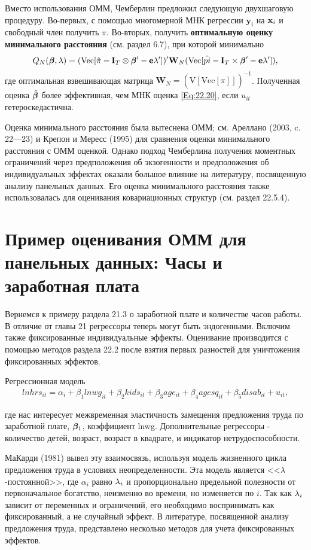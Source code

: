 Вместо использования ОММ, Чемберлин предложил следующую двухшаговую процедуру. Во-первых, с помощью многомерной МНК регрессии $\mathbf y_i$ на $\mathbf{x}_i$ и свободный член получить $\hat{\pi}$. Во-вторых, получить \textbf{оптимальную  оценку минимального расстояния} (см. раздел 6.7), при которой минимально
\begin{align}
Q_N(\bm{\beta}, \lambda)=(\mathrm{Vec}[\hat{\pi}-\mathbf I_T \otimes \bm{\beta}' - \mathbf e \lambda'])'\mathbf W_N(\mathrm{Vec}[\hat{pi}-\mathbf I_T \times \bm{\beta}' - \mathbf e \lambda']),
\nonumber
\end{align}
где оптимальная взвешивающая матрица $\mathbf W_N=(\hat{\mathrm{V}}[\mathrm{Vec}[\pi]])^{-1}$. Полученная оценка $\hat{\bm{\beta}}$ более эффективная, чем МНК оценка \ref{Eq:22.20}, если $u_{it}$ гетероскедастична.

Оценка минимального расстояния была вытеснена ОММ; см. Ареллано (2003, c. 22---23) и Крепон и Мересс (1995) для сравнения оценки минимального расстояния с ОММ оценкой. Однако подход Чемберлина получения моментных ограничений через предположения об экзогенности и предположения об индивидуальных эффектах оказали большое влияние на литературу, посвященную анализу панельных данных. Его оценка минимального расстояния также использовалась для оценивания ковариационных структур (см. раздел 22.5.4). 


\section{Пример оценивания ОММ для панельных данных: Часы и заработная плата}

Вернемся к примеру раздела 21.3 о заработной плате и количестве часов работы. В отличие от главы 21 регрессоры теперь могут быть эндогенными. Включим также фиксированные индивидуальные эффекты. Оценивание производится с помощью методов раздела 22.2 после взятия первых разностей для уничтожения фиксированных эффектов.

Регрессионная модель
\begin{align}
lnhrs_{it}=\alpha_i+\beta_1 lnwg_{it} + \beta_2 kids_{it} +\beta_3 age_{it} + \beta_4 agesq_{it} + \beta_5 disab_{it} + u_{it},
\nonumber
\end{align}


где нас интересует межвременная эластичность замещения предложения труда по заработной плате, $\bm{\beta}_1$, коэффициент lnwg. Дополнительные регрессоры - количество детей, возраст, возраст в квадрате, и индикатор нетрудоспособности.

МаКарди (1981) вывел эту взаимосвязь, используя модель жизненного цикла предложения труда в условиях неопределенности. Эта модель является <<$\lambda$-постоянной>>, где $\alpha_i$  равно $\lambda_i$ и пропорционально предельной полезности от первоначальное богатство, неизменно во времени, но изменяется по $i$. Так как $\lambda_i$ зависит от переменных и ограничений, его необходимо воспринимать как фиксированный, а не случайный эффект. В литературе, посвященной анализу предложения труда, представлено несколько методов для учета фиксированных эффектов.

